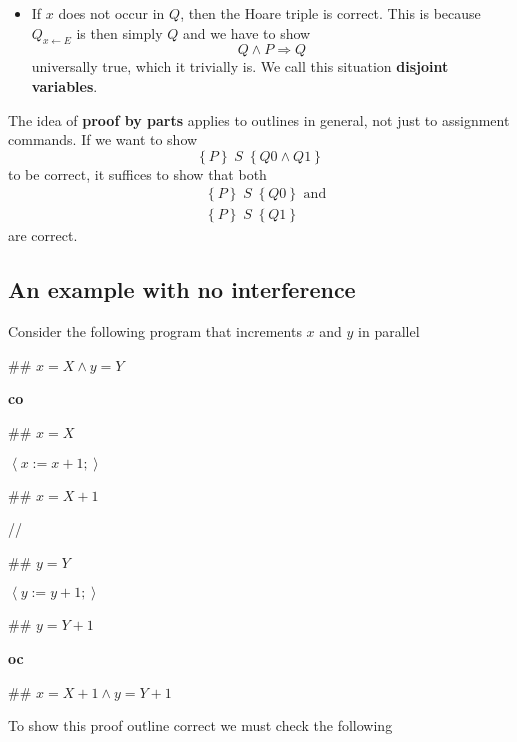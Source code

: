 \documentclass[muchmore,11pt]{article}%
\begin{document}
\begin{itemize}
\item If $x$ does not occur in $Q$, then the Hoare triple is correct. This is
because $Q_{x\leftarrow E}$ is then simply $Q$ and we have to show%
\[
Q\wedge P\Rightarrow Q
\]
universally true, which it trivially is. We call this situation
\textbf{disjoint variables}.
\end{itemize}

The idea of \textbf{proof by parts} applies to outlines in general, not just
to assignment commands. If we want to show%
\[
\left\{  P\right\}  \;S\;\left\{  Q0\wedge Q1\right\}
\]
to be correct, it suffices to show that both%
\begin{align*}
&  \left\{  P\right\}  \;S\;\left\{  Q0\right\}  \text{ and}\\
&  \left\{  P\right\}  \;S\;\left\{  Q1\right\}
\end{align*}
are correct.

\subsection{An example with no interference}

Consider the following program that increments $x$ and $y$ in parallel

\begin{code}
\#\# $x=X\wedge y=Y$

\textbf{co}

\begin{indent}
\item \#\# $x=X$

\item $\left\langle x:=x+1;\right\rangle $

\item \#\# $x=X+1$
\end{indent}

//

\begin{indent}
\item \#\# $y=Y$

\item $\left\langle y:=y+1;\right\rangle $

\item \#\# $y=Y+1$
\end{indent}

\textbf{oc}

\#\# $x=X+1\wedge y=Y+1$
\end{code}

To show this proof outline correct we must check the following
\end{document}
